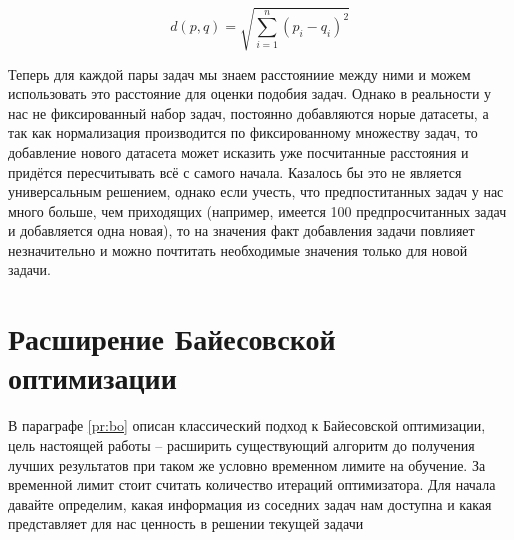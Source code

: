 \documentclass[times,specification,annotation]{itmo-student-thesis}
\begin{document}
	\begin{equation}
	\mathit d(p,q)=\sqrt{\sum_{i=1}^{n} (p_{i}-q_{i})^{2}}
	\label{eq:euclid}
	\end{equation}\par
	Теперь для каждой пары задач мы знаем расстояниие между ними и можем использовать это расстояние для оценки подобия задач. Однако в реальности у нас не фиксированный набор задач, постоянно добавляются норые датасеты, а так как нормализация производится по фиксированному множеству задач, то добавление нового датасета может исказить уже посчитанные расстояния и придётся пересчитывать всё с самого начала. Казалось бы это не является универсальным решением, однако если учесть, что предпоститанных задач у нас много больше, чем приходящих (например, имеется 100 предпросчитанных задач и добавляется одна новая), то на значения факт добавления задачи повлияет незначительно и можно почтитать необходимые значения только для новой задачи.
	
	\section{Расширение Байесовской оптимизации}
	В параграфе \ref{pr:bo} описан классический подход к Байесовской оптимизации, цель настоящей работы -- расширить существующий алгоритм до получения лучших результатов при таком же условно временном лимите на обучение. За временной лимит стоит считать количество итераций оптимизатора. Для начала давайте определим, какая информация из соседних задач нам доступна и какая представляет для нас ценность в решении текущей задачи\par
\end{document}
